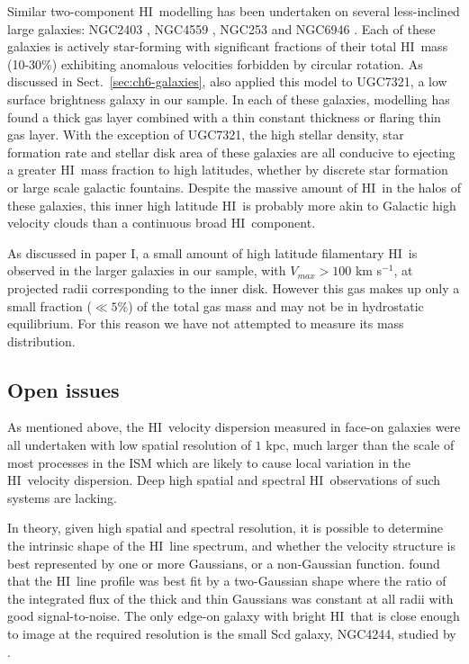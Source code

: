 \documentclass[traditabstract]{aa} %
\newcommand\HI{H{\small I}}
\newcommand\kms{km s$^{-1}$}
\begin{document}
Similar two-component \HI\ modelling has been undertaken on several
less-inclined large galaxies: NGC2403 \citep{fvmso2002}, NGC4559
\citep{bfobbs2005}, NGC253 \citep{bofvdhs2005} and NGC6946
\citep{fobss2004,bofvdhs2005}.  Each of these galaxies is actively
star-forming with significant fractions of their total \HI\ mass
(10-30\%) exhibiting anomalous velocities forbidden by circular
rotation. As discussed in Sect.~\ref{sec:ch6-galaxies},
\citet{mw2003} also applied this model to UGC7321, a low surface
brightness galaxy in our sample.  In each of these galaxies, modelling
has found a thick gas layer combined with a thin constant thickness or
flaring thin gas layer.  With the exception of UGC7321, the high
stellar density, star formation rate and stellar disk area of these
galaxies are all conducive to ejecting a greater \HI\ mass fraction to
high latitudes, whether by discrete star formation or large scale
galactic fountains.  Despite the massive amount of \HI\ in the halos of
these galaxies, this inner high latitude \HI\ is probably more akin to
Galactic high velocity clouds than a continuous broad \HI\ component.

As discussed in paper I, a small amount of
high latitude filamentary \HI\ is observed in the larger galaxies in
our sample, with $V_{max} > 100$ \kms, at projected radii corresponding
to the inner disk. However this gas makes up only a small fraction ($\ll
5\%$) of the total gas mass and may not be in hydrostatic
equilibrium. For this reason we have not attempted to measure its mass
distribution. 

\subsection{Open issues}

As mentioned above, the \HI\ velocity dispersion measured in
face-on galaxies were all undertaken with low
spatial resolution of $1$ kpc, much larger than the scale of most
processes in the ISM which are likely to cause local variation in the
\HI\ velocity dispersion. Deep high spatial and spectral \HI\ observations
of such systems are lacking.

In theory, given high spatial and spectral resolution, it is possible
to determine the intrinsic shape of the \HI\ line spectrum, and whether
the velocity structure is best represented by one or more Gaussians,
or a non-Gaussian function. 
\citet{pr2006} found that the \HI\ line profile was best fit by a
two-Gaussian shape where the ratio of the integrated flux of the thick
and thin Gaussians was constant at all radii with good
signal-to-noise. The only edge-on galaxy with bright \HI\ that is close
enough to image at the required resolution is the small Scd galaxy, NGC4244,
studied by \citet{olling1996a}.
\end{document}
